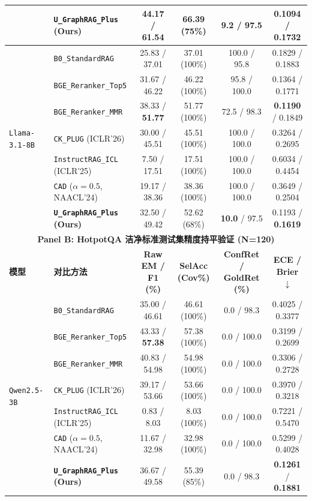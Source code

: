 \documentclass[11pt]{article}
\begin{document}
\begin{table}[t]
{{\begin{tabular}{llcccc}
& \textbf{\texttt{U\_GraphRAG\_Plus} (Ours)} & 44.17 / \textbf{61.54} & 66.39 (75\%) & \textbf{9.2} / 97.5 & \textbf{0.1094} / \textbf{0.1732} \\
\midrule
\multirow{7}{*}{\texttt{Llama-3.1-8B}}
& \texttt{B0\_StandardRAG} & 25.83 / 37.01 & 37.01 (100\%) & 100.0 / 95.8 & 0.1829 / 0.1883 \\
& \texttt{BGE\_Reranker\_Top5} & 31.67 / 46.22 & 46.22 (100\%) & 95.8 / 100.0 & 0.1364 / 0.1771 \\
& \texttt{BGE\_Reranker\_MMR} & 38.33 / \textbf{51.77} & 51.77 (100\%) & 72.5 / 98.3 & \textbf{0.1190} / 0.1849 \\
& \texttt{CK\_PLUG} (ICLR'26) & 30.00 / 45.51 & 45.51 (100\%) & 100.0 / 100.0 & 0.3264 / 0.2695 \\
& \texttt{InstructRAG\_ICL} (ICLR'25) & 7.50 / 17.51 & 17.51 (100\%) & 100.0 / 100.0 & 0.6034 / 0.4454 \\
& \texttt{CAD} ($\alpha=0.5$, NAACL'24) & 19.17 / 38.36 & 38.36 (100\%) & 100.0 / 100.0 & 0.3649 / 0.2504 \\
& \textbf{\texttt{U\_GraphRAG\_Plus} (Ours)} & 32.50 / 49.42 & 52.62 (68\%) & \textbf{10.0} / 97.5 & 0.1193 / \textbf{0.1619} \\
\midrule
\midrule
\multicolumn{6}{c}{\textbf{Panel B: HotpotQA 洁净标准测试集精度持平验证 (N=120)}} \\
\midrule
\textbf{模型} & \textbf{对比方法} & \textbf{Raw EM / F1 (\%)} & \textbf{SelAcc (Cov\%)} & \textbf{ConfRet / GoldRet (\%)} & \textbf{ECE / Brier $\downarrow$} \\
\midrule
\multirow{7}{*}{\texttt{Qwen2.5-3B}}
& \texttt{B0\_StandardRAG} & 35.00 / 46.61 & 46.61 (100\%) & 0.0 / 98.3 & 0.4025 / 0.3377 \\
& \texttt{BGE\_Reranker\_Top5} & 43.33 / \textbf{57.38} & 57.38 (100\%) & 0.0 / 100.0 & 0.3199 / 0.2699 \\
& \texttt{BGE\_Reranker\_MMR} & 40.83 / 54.98 & 54.98 (100\%) & 0.0 / 100.0 & 0.3306 / 0.2728 \\
& \texttt{CK\_PLUG} (ICLR'26) & 39.17 / 53.66 & 53.66 (100\%) & 0.0 / 100.0 & 0.3970 / 0.3218 \\
& \texttt{InstructRAG\_ICL} (ICLR'25) & 0.83 / 8.03 & 8.03 (100\%) & 0.0 / 100.0 & 0.7221 / 0.5470 \\
& \texttt{CAD} ($\alpha=0.5$, NAACL'24) & 11.67 / 32.98 & 32.98 (100\%) & 0.0 / 100.0 & 0.5299 / 0.4028 \\
& \textbf{\texttt{U\_GraphRAG\_Plus} (Ours)} & 36.67 / 49.58 & 55.39 (85\%) & 0.0 / 98.3 & \textbf{0.1261} / \textbf{0.1881} \\

\end{tabular}}}
\end{table}
\end{document}
